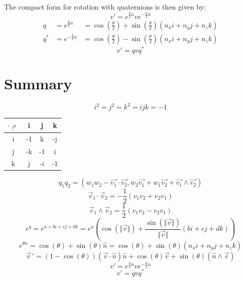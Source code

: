 \documentclass[10pt,a4paper]{article}
\begin{document}
The compact form for rotation with quaternions is then given by: 
$$
\boxed{
v' = e^{\frac{\theta}{2}n} v e^{-\frac{\theta}{2}n}
}
$$
\begin{equation*}
\begin{aligned}
q &= e^{\frac{\theta}{2}n} &= \cos\left(\frac{\theta}{2}\right) + \sin\left(\frac{\theta}{2}\right)(n_xi + n_yj + n_zk) \\
q^* &= e^{-\frac{\theta}{2}n} &= \cos\left(\frac{\theta}{2}\right) - \sin\left(\frac{\theta}{2}\right)(n_xi + n_yj + n_zk)
\end{aligned}
\end{equation*}
$$
\boxed{v' = qvq^*}
$$

\newpage
\section{Summary}
$$
\boxed{
i^2 = j^2 = k^2 = ijk = -1
}
$$
\begin{center}
\begin{tabular}{c|ccc}
$\cdot\Rsh$ & i & j & k \\ 
\hline 
i & -1 & k & -j \\ 
j & -k & -1 & i \\ 
k & j & -i & -1 \\ 
\end{tabular} 
\end{center}
$$
\boxed{
q_1q_2 = (w_1w_2 - \vec{v_1}\cdot\vec{v_2}, w_2\vec{v_1} + w_1\vec{v_2} + \vec{v_1}\wedge\vec{v_2})
}
$$
$$
\boxed{
\vec{v}_1\cdot\vec{v}_2 = -\frac{1}{2}(v_1v_2 + v_2v_1)
}
$$
$$
\boxed{
\vec{v}_1\wedge\vec{v}_2 = \frac{1}{2}(v_1v_2 - v_2v_1)
}
$$
$$
\boxed{
e^q = e^{a + bi + cj + dk} = e^a\left(\cos(\Vert\vec{v}\Vert) + \frac{\sin(\Vert\vec{v}\Vert)}{\Vert\vec{v}\Vert}(bi + cj + dk)\right)
}
$$
$$
\boxed{
e^{\theta n} = \cos(\theta) + \sin(\theta)\hat{n} 
			 = \cos(\theta) + \sin(\theta)(n_xi + n_yj + n_zk)
}
$$
$$
\boxed{
\vec{v}\,' = (1-\cos(\theta))(\vec{v}\cdot \hat{n})\hat{n} + \cos(\theta)\vec{v} + \sin(\theta)(\hat{n}\wedge\vec{v})
}
$$
$$
\boxed{
v' = e^{\frac{\theta}{2}n} v e^{-\frac{\theta}{2}n}
}
$$
$$
\boxed{v' = qvq^*}
$$
\end{document}
